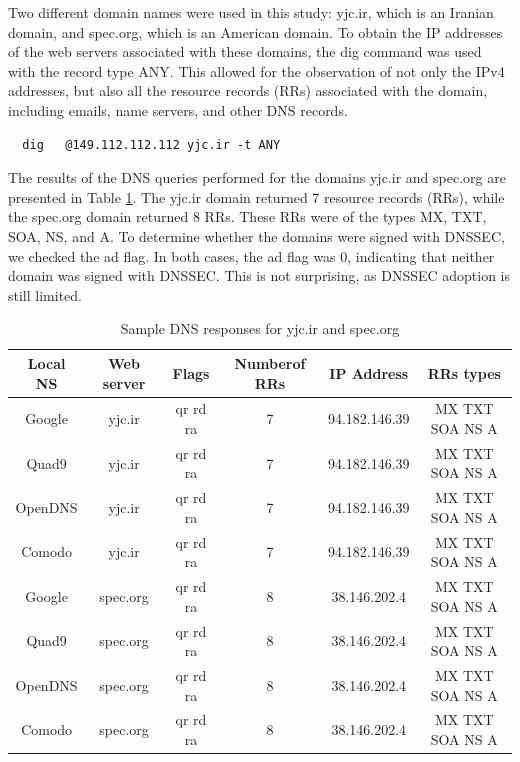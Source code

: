 \documentclass[eng]{class}
\begin{document}
Two different domain names were used in this study: yjc.ir, which is an Iranian domain, and spec.org, which is an American domain.
To obtain the IP addresses of the web servers associated with these domains, the dig command was used with the record type ANY.
This allowed for the observation of not only the IPv4 addresses, but also all the resource records (RRs) associated with the domain, including emails, name servers, and other DNS records.
\begin{lstlisting}
  dig   @149.112.112.112 yjc.ir -t ANY
\end{lstlisting}
The results of the DNS queries performed for the domains yjc.ir and spec.org are presented in Table \ref*{tab-4}.
The yjc.ir domain returned 7 resource records (RRs), while the spec.org domain returned 8 RRs.
These RRs were of the types MX, TXT, SOA, NS, and A. To determine whether the domains were signed with DNSSEC, we checked the ad flag.
In both cases, the ad flag was 0, indicating that neither domain was signed with DNSSEC.
This is not surprising, as DNSSEC adoption is still limited.
\begin{table}[H]
  \tiny
  \begin{tabular}{|c|c|c|c|c|c|}
    \hline
    \linewidth=0cm
    Local NS & Web server & Flags    & Numberof RRs & IP Address    & RRs types       \\
    \hline
    Google   & yjc.ir     & qr rd ra & 7            & 94.182.146.39 & MX TXT SOA NS A \\
    Quad9    & yjc.ir     & qr rd ra & 7            & 94.182.146.39 & MX TXT SOA NS A \\
    OpenDNS  & yjc.ir     & qr rd ra & 7            & 94.182.146.39 & MX TXT SOA NS A \\
    Comodo   & yjc.ir     & qr rd ra & 7            & 94.182.146.39 & MX TXT SOA NS A \\
    Google   & spec.org   & qr rd ra & 8            & 38.146.202.4  & MX TXT SOA NS A \\
    Quad9    & spec.org   & qr rd ra & 8            & 38.146.202.4  & MX TXT SOA NS A \\
    OpenDNS  & spec.org   & qr rd ra & 8            & 38.146.202.4  & MX TXT SOA NS A \\
    Comodo   & spec.org   & qr rd ra & 8            & 38.146.202.4  & MX TXT SOA NS A \\
    \hline
  \end{tabular}
  \caption{Sample DNS responses for yjc.ir and spec.org}
  \label{tab-4}
\end{table}
\end{document}
